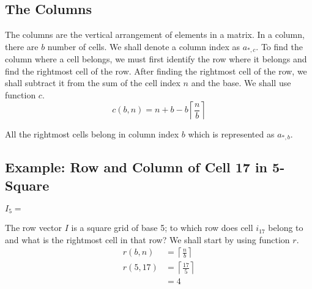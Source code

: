 \documentclass[letterpaper, twoside,12pt]{article}
\begin{document}
    \subsection{The Columns} \label{columns}
    The columns are the vertical arrangement of elements in a matrix. In a column, there are $b$ number of cells. We shall denote a column index as $a_{*,c}$. To find the column where a cell belongs, we must first identify the row where it belongs and find the rightmost cell of the row. After finding the rightmost cell of the row, we shall subtract it from the sum of the cell index $n$ and the base. We shall use function $c$.
    \begin{equation}
        c(b,n) = n + b - b\left\lceil \frac{n}{b} \right\rceil
    \end{equation}

    All the rightmost cells belong in column index $b$ which is represented as $a_{*,b}$.

    \newpage

    \subsection{Example: Row and Column of Cell 17 in 5-Square}
    \label{1_example_1}
    \begin{figure*}[ht]
        \centering
        \setcounter{MaxMatrixCols}{25}
            \centering
            $I_5 =$
    \end{figure*}

    The row vector $I$ is a square grid of base 5; to which row does cell $i_{17}$ belong to and what is the rightmost cell in that row? We shall start by using function $r$.
    \begin{equation*}
        \begin{split}
            r(b,n) &= \left\lceil \frac{n}{b} \right\rceil \\
            r(5,17) &= \left\lceil \frac{17}{5} \right\rceil \\
                &= 4
        \end{split}
    \end{equation*}
\end{document}
